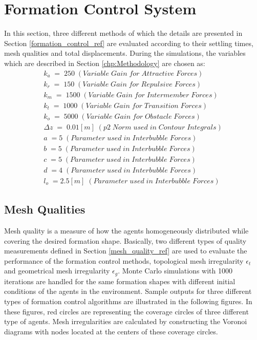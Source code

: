		
\section{Formation Control System}
In this section, three different methods of which the details are presented in Section \ref{formation_control_ref} are evaluated according to their settling times, mesh qualities and total displacements. During the simulations, the variables which are described in Section \ref{chp:Methodology} are chosen as:
\begin{align*}
  k_a\;=\;250\;(Variable\;Gain\;for\;Attractive\;Forces)\\
  k_r\;=\;150\;(Variable\;Gain\;for\;Repulsive\;Forces)\\
  k_m\;=\;1500\;(Variable\;Gain\;for\;Intermember\;Forces)\\
  k_t\;=\;1000\;(Variable\;Gain\;for\;Transition\;Forces)\\
  k_o\;=\;5000\;(Variable\;Gain\;for\;Obstacle\;Forces)\\
  \Delta z\;=\;0.01[m]\;(p2\;Norm\;used\;in\;Contour\;Integrals)\\
  a\;=5\;(Parameter\;used\;in\;Interbubble\;Forces)\\
  b\;=5\;(Parameter\;used\;in\;Interbubble\;Forces)\\ 
  c\;=5\;(Parameter\;used\;in\;Interbubble\;Forces)\\ 
  d\;=4\;(Parameter\;used\;in\;Interbubble\;Forces)\\
  l_o\;=2.5[m]\;(Parameter\;used\;in\;Interbubble\;Forces)     
\end{align*}

\subsection{Mesh Qualities} 
Mesh quality is a measure of how the agents homogeneously distributed while covering the desired formation shape. Basically, two different types of quality measurements defined in Section \ref{mesh_quality_ref} are used to evaluate the performance of the formation control methods, topological mesh irregularity $\epsilon_t$ and geometrical mesh irregularity $\epsilon_g$. Monte Carlo simulations with 1000 iterations are handled for the same formation shapes with different initial conditions of the agents in the environment. Sample outputs for three different types of formation control algorithms are illustrated in the following figures. In these figures, red circles are representing the coverage circles of three different type of agents. Mesh irregularities are calculated by constructing the Voronoi diagrams with nodes located at the centers of these coverage circles.
  
